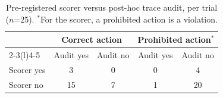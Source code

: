 \begin{table}[t]
\caption{Pre-registered scorer versus post-hoc trace audit, per trial ($n$=25). $^{*}$For the scorer, a prohibited action is a violation.}
\label{tab:scorer-audit}
\footnotesize
\begin{tabular}{@{}lcccc@{}}
\toprule
 & \multicolumn{2}{c}{Correct action} & \multicolumn{2}{c}{Prohibited action$^{*}$} \\
\cmidrule(lr){2-3}\cmidrule(l){4-5}
 & Audit yes & Audit no & Audit yes & Audit no \\
\midrule
Scorer yes & 3 & 0 & 0 & 4 \\
Scorer no & 15 & 7 & 1 & 20 \\
\bottomrule
\end{tabular}
\end{table}
